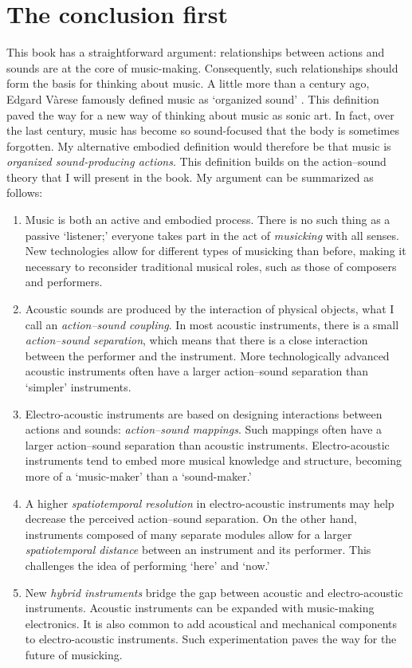 \section{The conclusion first}

This book has a straightforward argument: relationships between actions and sounds are at the core of music-making. Consequently, such relationships should form the basis for thinking about music. A little more than a century ago, Edgard Vàrese famously defined music as `organized sound' \citep{risset_recollections_2015}. This definition paved the way for a new way of thinking about music as sonic art. In fact, over the last century, music has become so sound-focused that the body is sometimes forgotten. My alternative embodied definition would therefore be that music is \emph{organized sound-producing actions}. This definition builds on the action--sound theory that I will present in the book. My argument can be summarized as follows:

\begin{enumerate}
  \item Music is both an active and embodied process. There is no such thing as a passive `listener;' everyone takes part in the act of \emph{musicking} with all senses. New technologies allow for different types of musicking than before, making it necessary to reconsider traditional musical roles, such as those of composers and performers.

  \item Acoustic sounds are produced by the interaction of physical objects, what I call an \emph{action--sound coupling}. In most acoustic instruments, there is a small \emph{action--sound separation}, which means that there is a close interaction between the performer and the instrument. More technologically advanced acoustic instruments often have a larger action--sound separation than `simpler' instruments.

  \item Electro-acoustic instruments are based on designing interactions between actions and sounds: \emph{action--sound mappings}. Such mappings often have a larger action--sound separation than acoustic instruments. Electro-acoustic instruments tend to embed more musical knowledge and structure, becoming more of a `music-maker' than a `sound-maker.'

  \item A higher \emph{spatiotemporal resolution} in electro-acoustic instruments may help decrease the perceived action--sound separation. On the other hand, instruments composed of many separate modules allow for a larger \emph{spatiotemporal distance} between an instrument and its performer. This challenges the idea of performing `here' and `now.'

  \item New \emph{hybrid instruments} bridge the gap between acoustic and electro-acoustic instruments. Acoustic instruments can be expanded with music-making electronics. It is also common to add acoustical and mechanical components to electro-acoustic instruments. Such experimentation paves the way for the future of musicking.

\end{enumerate}

